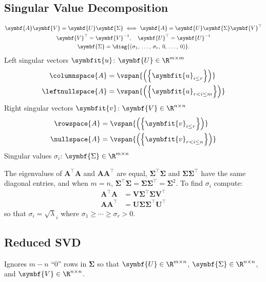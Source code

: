 \documentclass{article}
\begin{document}
\begin{multicols*}{3}
    \section{Singular Value Decomposition}
    \begin{gather*}
        \symbf{A} \symbf{V} = \symbf{U} \symbf{\Sigma}
        \iff
        \symbf{A} = \symbf{U} \symbf{\Sigma} \symbf{V}^\top                                        \\
        \symbf{V}^\top = \symbf{V}^{-1}, \quad \symbf{U}^\top = \symbf{U}^{-1}                                                          \\
        \symbf{\Sigma} = \diag{\left( \sigma_1,\: \dots,\: \sigma_r,\: 0,\: \dots,\: 0 \right)}.
    \end{gather*}
    Left singular vectors \(\symbfit{u}\): \(\symbf{U} \in \R^{m \times m}\)
    \begin{align*}
        \columnspace{A}   & = \vspan{\left( \left\{ \symbfit{u}_{i \leq r} \right\} \right)}     \\
        \leftnullspace{A} & = \vspan{\left( \left\{ \symbfit{u}_{r < i \leq m} \right\} \right)}
    \end{align*}
    Right singular vectors \(\symbfit{v}\): \(\symbf{V} \in  \R^{n \times n}\)
    \begin{align*}
        \rowspace{A}  & = \vspan{\left( \left\{ \symbfit{v}_{i \leq r} \right\} \right)}     \\
        \nullspace{A} & = \vspan{\left( \left\{ \symbfit{v}_{r < i \leq n} \right\} \right)}
    \end{align*}
    Singular values \(\sigma_i\): \(\symbf{\Sigma} \in \R^{m \times n}\)

    The eigenvalues of \(\symbf{A}^\top\symbf{A}\) and \(\symbf{A}\symbf{A}^\top\)
    are equal, \(\symbf{\Sigma}^\top \symbf{\Sigma}\) and \(\symbf{\Sigma} \symbf{\Sigma}^\top\) have the same diagonal entries, and
    when \(m = n\), \(\symbf{\Sigma}^\top\symbf{\Sigma} = \symbf{\Sigma} \symbf{\Sigma}^\top = \symbf{\Sigma}^2\).
    To find \(\sigma_i\) compute:
    \begin{align*}
        \symbf{A}^\top \symbf{A} & = \symbf{V} \symbf{\Sigma}^\top \symbf{\Sigma} \symbf{V}^\top \\
        \symbf{A} \symbf{A}^\top & = \symbf{U} \symbf{\Sigma} \symbf{\Sigma}^\top \symbf{U}^\top
    \end{align*}
    so that \(\sigma_i = \sqrt{\lambda}_i\) where \(\sigma_1 \geq \cdots \geq \sigma_r > 0\).
    \subsection{Reduced SVD}
    Ignores \(m - n\) ``0'' rows in \(\symbf{\Sigma}\) so that \(\symbf{U} \in \R^{m \times n}\), \(\symbf{\Sigma} \in \R^{n \times n}\), and \(\symbf{V} \in \R^{n \times n}\).

\end{multicols*}
\end{document}
